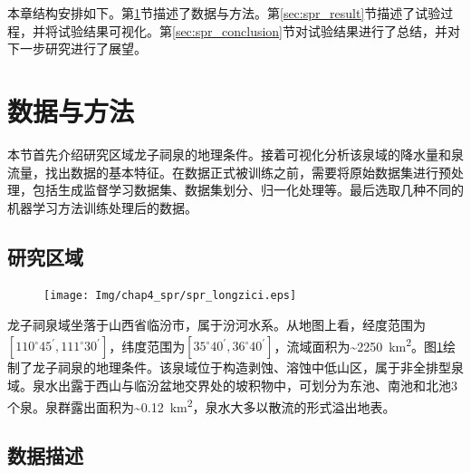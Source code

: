 本章结构安排如下。第\ref{sec:spr_data_method}节描述了数据与方法。第\ref{sec:spr_result}节描述了试验过程，并将试验结果可视化。第\ref{sec:spr_conclusion}节对试验结果进行了总结，并对下一步研究进行了展望。

\section{数据与方法}\label{sec:spr_data_method}

本节首先介绍研究区域龙子祠泉的地理条件。接着可视化分析该泉域的降水量和泉流量，找出数据的基本特征。在数据正式被训练之前，需要将原始数据集进行预处理，包括生成监督学习数据集、数据集划分、归一化处理等。最后选取几种不同的机器学习方法训练处理后的数据。

\subsection{研究区域}\label{sec:spr_area}

\begin{figure}[!htbp]
  \centering
  \texttt{[image: Img/chap4\_spr/spr\_longzici.eps]}
  \label{fig:spri_longzici}
\end{figure}

龙子祠泉域坐落于山西省临汾市，属于汾河水系。从地图上看，经度范围为$[110^\circ 45^\prime,111^\circ 30^\prime]$，纬度范围为$[35^\circ 40^\prime,36^\circ 40^\prime]$，流域面积为\sim\SI{2250}{km^{2}}。图\ref{fig:spri_longzici}绘制了龙子祠泉的地理条件。该泉域位于构造剥蚀、溶蚀中低山区，属于非全排型泉域。泉水出露于西山与临汾盆地交界处的坡积物中，可划分为东池、南池和北池3个泉。泉群露出面积为\sim\SI{0.12}{km^{2}}，泉水大多以散流的形式溢出地表。

\subsection{数据描述}\label{sec:spr_deal_data}

